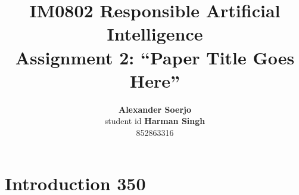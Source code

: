 \documentclass{article}
\title{
    IM0802 \textendash{} Responsible Artificial Intelligence \\
    {\normalfont Assignment 2: ``Paper Title Goes Here''}
}
\author{
\textbf{Alexander Soerjo} \\[0.3em] student id \And
\textbf{Harman Singh} \\[0.3em] 852863316}
\begin{document}
\maketitle


\begin{abstract}
    
    
\end{abstract}

\section{Introduction 350}
\label{sec:introduction}



    
% 



% 
% 


% 
% 


% 
% 







\end{document}
